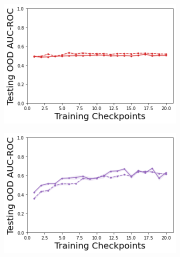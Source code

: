\begin{figure}
    \begin{subfigure}{.245\textwidth}
        \includegraphics[width=\textwidth]{sections/011_icml2022/resources/DropOut-AcrobotOOD-v0-AUC-ROC-epistemic_-testing-strategy.png}
    \end{subfigure}
    \begin{subfigure}{.245\textwidth}
        \includegraphics[width=\textwidth]{sections/011_icml2022/resources/Ensemble-AcrobotOOD-v0-AUC-ROC-epistemic_-testing-strategy.png}
    \end{subfigure}
    \begin{subfigure}{.245\textwidth}

\end{subfigure}
\end{figure}
